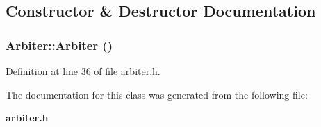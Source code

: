\subsection{Constructor \& Destructor Documentation}
\subsubsection[{Arbiter}]{\setlength{\rightskip}{0pt plus 5cm}Arbiter::Arbiter ()\hspace{0.3cm}{\tt  [inline]}}\label{classArbiter_ca96800fafab40183554debe9faf682d}




Definition at line 36 of file arbiter.h.

The documentation for this class was generated from the following file:\begin{CompactItemize}
\item 
{\bf arbiter.h}\end{CompactItemize}
